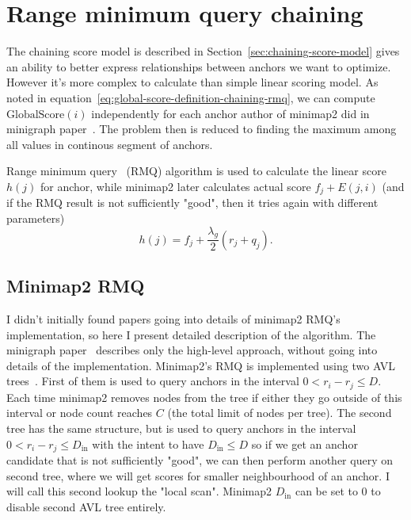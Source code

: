 \section{Range minimum query chaining}
\label{sec:chaining-rmq-idea}

The chaining score model is described in Section~\ref{sec:chaining-score-model} gives an ability to better express relationships between anchors we want to optimize. 
However it's more complex to calculate than simple linear scoring model.
As noted in equation~\ref{eq:global-score-definition-chaining-rmq}, we can compute $\text{GlobalScore}(i)$ independently for each anchor author of minimap2 did in minigraph paper~\cite{minimap2_rmq_scoring_minigraph}.
The problem then is reduced to finding the maximum among all values in continous segment of anchors.

Range minimum query~\cite{cp_algorithms_rmq} (RMQ) algorithm is used to calculate the linear score $h(j)$ for anchor, while minimap2 later calculates actual score $f_j+E(j,i)$ (and if the RMQ result is not sufficiently "good", then it tries again with different parameters)
\begin{equation}
  h(j)=f_j+\frac{\lambda_g}{2}(r_j+q_j).
\label{eq:chaining-rmq-h}
\end{equation}

\subsection{Minimap2 RMQ}
\label{sec:chaining-minimap2-rmq}

I didn't initially found papers going into details of minimap2 RMQ's implementation, so here I present detailed description of the algorithm. The minigraph paper~\cite{minimap2_rmq_scoring_minigraph} describes only the high-level approach, without going into details of the implementation.
Minimap2's RMQ is implemented using two AVL trees~\cite{cp_algorithms_segment_tree}. First of them is used to query anchors in the interval \(0<r_i-r_j\leq D\). Each time minimap2 removes nodes from the tree if either they go outside of this interval or node count reaches $C$ (the total limit of nodes per tree).
The second tree has the same structure, but is used to query anchors in the interval \(0<r_i-r_j\leq D_{\mathrm{in}}\) with the intent to have $D_{\mathrm{in}} \leq D$ so if we get an anchor candidate that is not sufficiently "good", we can then perform another query on second tree, where we will get scores for smaller neighbourhood of an anchor.
I will call this second lookup the "local scan".
Minimap2 $D_{\mathrm{in}}$ can be set to $0$ to disable second AVL tree entirely.

